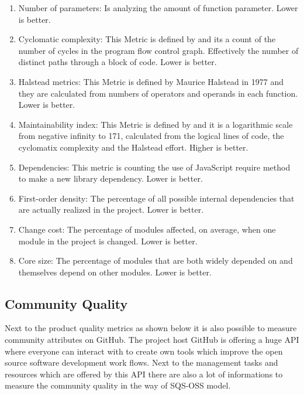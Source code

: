 \documentclass[DIV=calc,paper=a4,fontsize=9pt,twocolumn]{scrartcl}
\begin{document}
\begin{enumerate}
    \item Number of parameters: Is analyzing the amount of function parameter. Lower is better.
    \item Cyclomatic complexity: This Metric is defined by \citet{mccabe1976complexity} and its a count of the number of cycles in the program flow control graph. Effectively the number of distinct paths through a block of code. Lower is better.
    \item Halstead metrics: This Metric is defined by Maurice Halstead in 1977 \citep{zuse2005resolving} and they are calculated from numbers of operators and operands in each function. Lower is better.
    \item Maintainability index: This Metric is defined by \citet{oman1992metrics} and it is a logarithmic scale from negative infinity to 171, calculated from the logical lines of code, the cyclomatix complexity and the Halstead effort. Higher is better.
    \item Dependencies: This metric is counting the use of JavaScript require method to make a new library dependency. Lower is better.
    \item First-order density: The percentage of all possible internal dependencies that are actually realized in the project. Lower is better.
    \item Change cost: The percentage of modules affected, on average, when one module in the project is changed. Lower is better.
    \item Core size: The percentage of modules that are both widely depended on and themselves depend on other modules. Lower is better.
\end{enumerate}

\citep{escomplex2013}

\subsection{Community Quality}

Next to the product quality metrics as shown below it is also possible to measure community attributes on GitHub. The project host GitHub is offering a huge API where everyone can interact with to create own tools which improve the open source software development work flows. Next to the management tasks and resources which are offered by this API there are also a lot of informations to measure the community quality in the way of SQS-OSS model. \citep{githubAPI2013}
\end{document}
